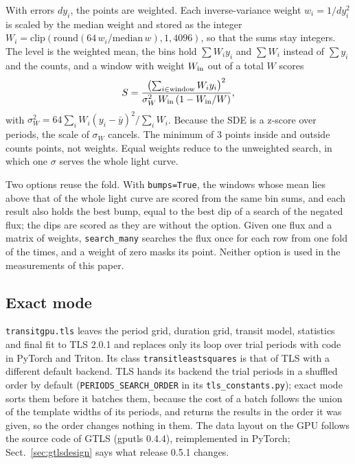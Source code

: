 \documentclass{aastex631}
\begin{document}
With errors $dy_i$, the points are weighted. Each inverse-variance weight $w_i=1/dy_i^2$ is scaled by the median weight and stored as the integer $W_i=\mathrm{clip}(\mathrm{round}(64\,w_i/\mathrm{median}\,w),1,4096)$, so that the sums stay integers. The level is the weighted mean, the bins hold $\sum W_iy_i$ and $\sum W_i$ instead of $\sum y_i$ and the counts, and a window with weight $W_{\rm in}$ out of a total $W$ scores
\begin{equation}
S = \frac{\left(\sum_{i\in\text{window}} W_iy_i\right)^2}{\sigma_W^2\, W_{\rm in}\,(1 - W_{\rm in}/W)} ,
\end{equation}
with $\sigma_W^2=64\sum_iW_i(y_i-\bar y)^2/\sum_iW_i$. Because the SDE is a z-score over periods, the scale of $\sigma_W$ cancels. The minimum of 3 points inside and outside counts points, not weights. Equal weights reduce to the unweighted search, in which one $\sigma$ serves the whole light curve.

Two options reuse the fold. With \texttt{bumps=True}, the windows whose mean lies above that of the whole light curve are scored from the same bin sums, and each result also holds the best bump, equal to the best dip of a search of the negated flux; the dips are scored as they are without the option. Given one flux and a matrix of weights, \texttt{search\_many} searches the flux once for each row from one fold of the times, and a weight of zero masks its point. Neither option is used in the measurements of this paper.

\subsection{Exact mode}\label{sec:exact}
\texttt{transitgpu.tls} leaves the period grid, duration grid, transit model, statistics and final fit to TLS 2.0.1 and replaces only its loop over trial periods with code in PyTorch and Triton. Its class \texttt{transitleastsquares} is that of TLS with a different default backend. TLS hands its backend the trial periods in a shuffled order by default (\texttt{PERIODS\_SEARCH\_ORDER} in its \texttt{tls\_constants.py}); exact mode sorts them before it batches them, because the cost of a batch follows the union of the template widths of its periods, and returns the results in the order it was given, so the order changes nothing in them. The data layout on the GPU follows the source code of GTLS (gputls 0.4.4), reimplemented in PyTorch; Sect.~\ref{sec:gtlsdesign} says what release 0.5.1 changes.
\end{document}

